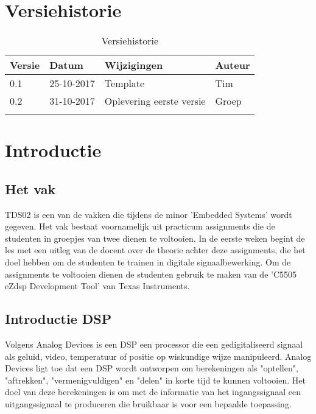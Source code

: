 \documentclass[11pt,a4paper]{article}
\begin{document}
	\section{Versiehistorie}
	\begin{table}[H]
		\centering
		\label{Versiehistorie}
		\begin{tabular}{|p{1cm}|p{2cm}|p{6cm}|p{2cm}|}
			\hline
			\rowcolor[HTML]{FFCC67}
			\textbf{Versie} & \textbf{Datum} & \textbf{Wijzigingen} & \textbf{Auteur} \\ \hline
			0.1    & 25-10-2017 & Template    & Tim \\ \hline
			0.2	   & 31-10-2017 & Oplevering eerste versie  & Groep \\ \hline
			&       &             &        \\ \hline
		\end{tabular}
		\caption {Versiehistorie} \label{tab:title} 
	\end{table}	


	\section{Introductie}
		\subsection{Het vak}
		TDS02 is een van de vakken die tijdens de minor 'Embedded Systems' wordt gegeven. Het vak bestaat voornamelijk uit practicum assignments die de studenten in groepjes van twee dienen te voltooien. In de eerste weken begint de les met een uitleg van de docent over de theorie achter deze assignments, die het doel hebben om de studenten te trainen in digitale signaalbewerking. Om de assignments te voltooien dienen de studenten gebruik te maken van de 'C5505 eZdsp Development Tool' van Texas Instruments.
		
		\subsection{Introductie DSP}
		Volgens Analog Devices \cite{analog} is een DSP een processor die een gedigitaliseerd signaal als geluid, video, temperatuur of positie op wiskundige wijze manipuleerd. Analog Devices ligt toe dat een DSP wordt ontworpen om berekeningen als "optellen", "aftrekken", "vermenigvuldigen" en "delen" in korte tijd te kunnen voltooien. Het doel van deze berekeningen is om met de informatie van het ingangssignaal een uitgangssignaal te produceren die bruikbaar is voor een bepaalde toepassing. 
		
\end{document}
